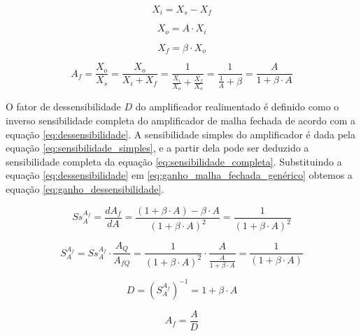 \documentclass[openright]{normas-utf-tex} %
\begin{document}
\begin{equation} \label{eq:X_i_X_s_X_f}
X_i = X_s - X_f
\end{equation}

\begin{equation} \label{eq:X_o_A_X_i}
X_o = A \cdot X_i 
\end{equation}

\begin{equation} \label{eq:X_f_beta_X_o}
X_f = \beta \cdot X_o
\end{equation}

\begin{equation}\label{eq:ganho_malha_fechada_genérico}
A_f = \frac{X_o}{X_s} = \frac{X_o}{X_i + X_f} = \frac{1}{\frac{X_i}{X_o}+\frac{X_f}{X_o}} = \frac{1}{\frac{1}{A}+\beta} = \frac{A}{1+\beta \cdot A}
\end{equation}

O fator de dessensibilidade $D$ do amplificador realimentado é definido como o inverso sensibilidade completa do amplificador de malha fechada de acordo com a equação \ref{eq:dessensibilidade}. A sensibilidade simples do amplificador é dada pela equação \ref{eq:sensibilidade_simples}, e a partir dela pode ser deduzido a sensibilidade completa da equação \ref{eq:sensibilidade_completa}. Substituindo a equação \ref{eq:dessensibilidade} em \ref{eq:ganho_malha_fechada_genérico}  obtemos a equação \ref{eq:ganho_dessensibilidade}. \cite{pedroni,millman} 

\begin{equation} \label{eq:sensibilidade_simples}
Ss^{A_f}_{A} = \displaystyle \frac{dA_f}{dA} = \frac{\left(1+\beta \cdot A\right) - \beta \cdot A}{\left(1 + \beta \cdot A\right)^2} = \frac{1}{\left(1 + \beta \cdot A \right)^2}
\end{equation}

\begin{equation} \label{eq:sensibilidade_completa}
S^{A_f}_{A} = Ss^{A_f}_{A} \cdot \frac{A_Q}{A_{fQ}} = \frac{1}{\left(1 + \beta \cdot A \right)^2} \cdot \frac{A}{\frac{A}{1+\beta \cdot A}} = \frac{1}{\left(1 + \beta \cdot A \right)}
\end{equation}

\begin{equation} \label{eq:dessensibilidade}
D = \left(S^{A_f}_{A}\right)^{-1} =1 + \beta \cdot A
\end{equation}

\begin{equation}\label{eq:ganho_dessensibilidade}
A_f = \frac{A}{D} 
\end{equation}
\end{document}
